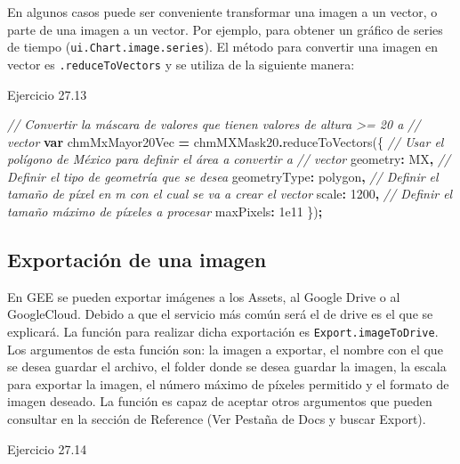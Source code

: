 \documentclass[
  12pt,
  letterpaper,
  twoside]{book}
\newenvironment{Shaded}{\begin{snugshade}}{\end{snugshade}}
\newcommand{\CommentTok}[1]{\textcolor[rgb]{0.56,0.35,0.01}{\textit{#1}}}
\newcommand{\DataTypeTok}[1]{\textcolor[rgb]{0.13,0.29,0.53}{#1}}
\newcommand{\DecValTok}[1]{\textcolor[rgb]{0.00,0.00,0.81}{#1}}
\newcommand{\FloatTok}[1]{\textcolor[rgb]{0.00,0.00,0.81}{#1}}
\newcommand{\FunctionTok}[1]{\textcolor[rgb]{0.00,0.00,0.00}{#1}}
\newcommand{\KeywordTok}[1]{\textcolor[rgb]{0.13,0.29,0.53}{\textbf{#1}}}
\newcommand{\NormalTok}[1]{#1}
\newcommand{\OperatorTok}[1]{\textcolor[rgb]{0.81,0.36,0.00}{\textbf{#1}}}
\newcommand{\StringTok}[1]{\textcolor[rgb]{0.31,0.60,0.02}{#1}}
\begin{document}
En algunos casos puede ser conveniente transformar una imagen a un vector, o parte de una imagen a un vector. Por ejemplo, para obtener un gráfico de series de tiempo (\texttt{ui.Chart.image.series}). El método para convertir una imagen en vector es \texttt{.reduceToVectors} y se utiliza de la siguiente manera:

Ejercicio 27.13

\begin{Shaded}
\begin{Highlighting}[]
\CommentTok{// Convertir la máscara de valores que tienen valores de altura \textgreater{}= 20 a }
\CommentTok{// vector}
\KeywordTok{var}\NormalTok{ chmMxMayor20Vec }\OperatorTok{=}\NormalTok{ chmMXMask20}\OperatorTok{.}\FunctionTok{reduceToVectors}\NormalTok{(\{}
     \CommentTok{// Usar el polígono de México para definir el área a convertir a }
     \CommentTok{// vector}
  \DataTypeTok{geometry}\OperatorTok{:}\NormalTok{ MX}\OperatorTok{,}
\CommentTok{// Definir el tipo de geometría que se desea}
  \DataTypeTok{geometryType}\OperatorTok{:} \StringTok{\textquotesingle{}polygon\textquotesingle{}}\OperatorTok{,}
\CommentTok{// Definir el tamaño de píxel en m con el cual se va a crear el vector}
  \DataTypeTok{scale}\OperatorTok{:} \DecValTok{1200}\OperatorTok{,}
\CommentTok{// Definir el tamaño máximo de píxeles a procesar}
  \DataTypeTok{maxPixels}\OperatorTok{:} \FloatTok{1e11}
\NormalTok{\})}\OperatorTok{;}
\end{Highlighting}
\end{Shaded}

\hypertarget{exportaciuxf3n-de-una-imagen}{%
\subsection{Exportación de una imagen}\label{exportaciuxf3n-de-una-imagen}}

En GEE se pueden exportar imágenes a los Assets, al Google Drive o al GoogleCloud. Debido a que el servicio más común será el de drive es el que se explicará. La función para realizar dicha exportación es \texttt{Export.imageToDrive}. Los argumentos de esta función son: la imagen a exportar, el nombre con el que se desea guardar el archivo, el folder donde se desea guardar la imagen, la escala para exportar la imagen, el número máximo de píxeles permitido y el formato de imagen deseado. La función es capaz de aceptar otros argumentos que pueden consultar en la sección de Reference (Ver Pestaña de Docs y buscar Export).

Ejercicio 27.14
\end{document}
